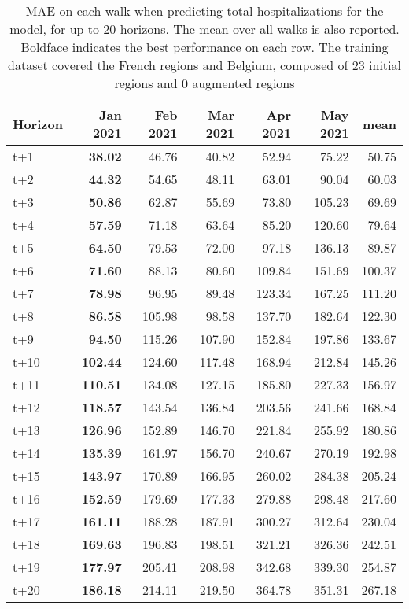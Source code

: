 \begin{table}[H]
\centering
\caption{MAE on each walk when predicting total hospitalizations for the model, for up to 20 horizons. The mean over all walks is also reported. Boldface indicates the best performance on each row. The training dataset covered the French regions and Belgium, composed of 23 initial regions and 0 augmented regions }
\label{tab:MAE_walk_custom_linear_regression}
\begin{tabular}{lrrrrrr}
\toprule
Horizon &  Jan 2021 &  Feb 2021 &  Mar 2021 &  Apr 2021 &  May 2021 &   mean \\
\midrule
t+1  & \textbf{38.02}  & 46.76  & 40.82  & 52.94  & 75.22  & 50.75  \\
t+2  & \textbf{44.32}  & 54.65  & 48.11  & 63.01  & 90.04  & 60.03  \\
t+3  & \textbf{50.86}  & 62.87  & 55.69  & 73.80  & 105.23  & 69.69  \\
t+4  & \textbf{57.59}  & 71.18  & 63.64  & 85.20  & 120.60  & 79.64  \\
t+5  & \textbf{64.50}  & 79.53  & 72.00  & 97.18  & 136.13  & 89.87  \\
t+6  & \textbf{71.60}  & 88.13  & 80.60  & 109.84  & 151.69  & 100.37  \\
t+7  & \textbf{78.98}  & 96.95  & 89.48  & 123.34  & 167.25  & 111.20  \\
t+8  & \textbf{86.58}  & 105.98  & 98.58  & 137.70  & 182.64  & 122.30  \\
t+9  & \textbf{94.50}  & 115.26  & 107.90  & 152.84  & 197.86  & 133.67  \\
t+10  & \textbf{102.44}  & 124.60  & 117.48  & 168.94  & 212.84  & 145.26  \\
t+11  & \textbf{110.51}  & 134.08  & 127.15  & 185.80  & 227.33  & 156.97  \\
t+12  & \textbf{118.57}  & 143.54  & 136.84  & 203.56  & 241.66  & 168.84  \\
t+13  & \textbf{126.96}  & 152.89  & 146.70  & 221.84  & 255.92  & 180.86  \\
t+14  & \textbf{135.39}  & 161.97  & 156.70  & 240.67  & 270.19  & 192.98  \\
t+15  & \textbf{143.97}  & 170.89  & 166.95  & 260.02  & 284.38  & 205.24  \\
t+16  & \textbf{152.59}  & 179.69  & 177.33  & 279.88  & 298.48  & 217.60  \\
t+17  & \textbf{161.11}  & 188.28  & 187.91  & 300.27  & 312.64  & 230.04  \\
t+18  & \textbf{169.63}  & 196.83  & 198.51  & 321.21  & 326.36  & 242.51  \\
t+19  & \textbf{177.97}  & 205.41  & 208.98  & 342.68  & 339.30  & 254.87  \\
t+20  & \textbf{186.18}  & 214.11  & 219.50  & 364.78  & 351.31  & 267.18  \\

\bottomrule
\end{tabular}
\end{table}
